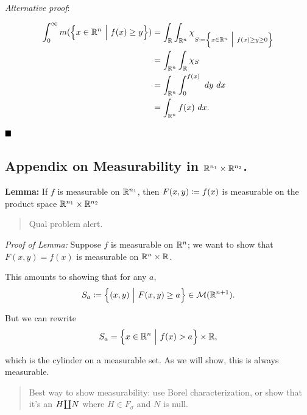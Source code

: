 \emph{Alternative proof}:

\begin{align*}
\int_0^\infty m ( \left\{{x\in {\mathbb{R}}^n {~\mathrel{\Big|}~} f(x) \geq y}\right\}) 
&= \int_{{\mathbb{R}}} \int_{{\mathbb{R}}^n} \chi_{S \coloneqq \left\{{x\in {\mathbb{R}}^n {~\mathrel{\Big|}~} f(x) \geq y \geq 0}\right\}} \\
&= \int_{{\mathbb{R}}^n} \int_{\mathbb{R}} \chi_S \\
&= \int_{{\mathbb{R}}^n} \int_0^{f(x)} ~dy~dx \\
&= \int_{{\mathbb{R}}^n} f(x)~dx
.\end{align*}

\(\qed\)

\hypertarget{appendix-on-measurability-in-rrn_1-cross-rrn_2.}{%
\subsection{\texorpdfstring{Appendix on Measurability in
\({\mathbb{R}}^{n_1} \times {\mathbb{R}}^{n_2}\).}{Appendix on Measurability in \textbackslash RR\^{}\{n\_1\} \textbackslash cross \textbackslash RR\^{}\{n\_2\}.}}\label{appendix-on-measurability-in-rrn_1-cross-rrn_2.}}

\textbf{Lemma:} If \(f\) is measurable on \({\mathbb{R}}^{n_1}\), then
\(F(x, y) \coloneqq f(x)\) is measurable on the product space
\({\mathbb{R}}^{n_1} \times {\mathbb{R}}^{n_2}\)

\begin{quote}
Qual problem alert.
\end{quote}

\emph{Proof of Lemma:} Suppose \(f\) is measurable on \({\mathbb{R}}^n\); we want
to show that \(F(x, y) = f(x)\) is measurable on \({\mathbb{R}}^n \times {\mathbb{R}}\).

This amounts to showing that for any \(a\),
\begin{align*}
S_a \coloneqq \left\{{(x,y) {~\mathrel{\Big|}~} F(x, y) \geq a}\right\} \in \mathcal{M}({\mathbb{R}}^{n+1}).\end{align*}

But we can rewrite
\begin{align*}
S_a = \left\{{x\in{\mathbb{R}}^n {~\mathrel{\Big|}~} f(x) > a}\right\} \times {\mathbb{R}}
,\end{align*}

which is the cylinder on a measurable set. As we will show, this is
always measurable.

\begin{quote}
Best way to show measurability: use Borel characterization, or show that
it's an \(H {\coprod} N\) where \(H \in F_\sigma\) and \(N\) is null.
\end{quote}

